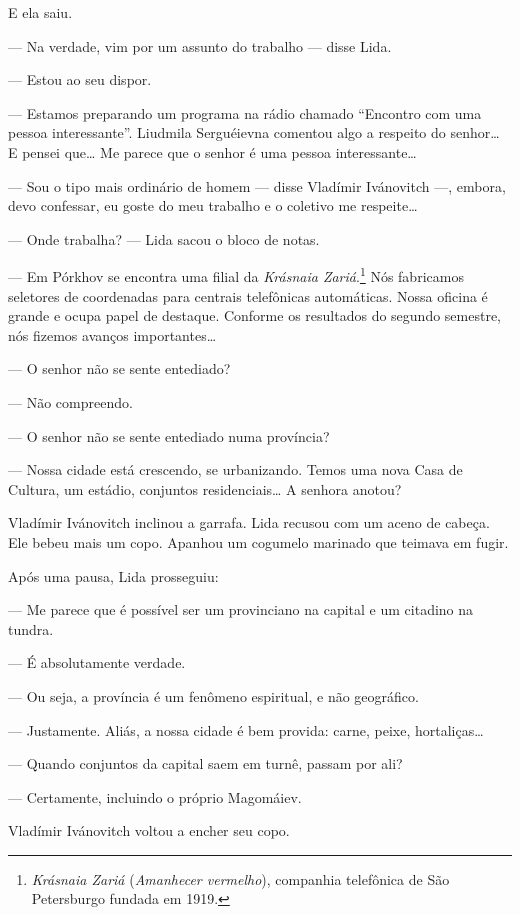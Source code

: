 E ela saiu.

--- Na verdade, vim por um assunto do trabalho --- disse Lida.

--- Estou ao seu dispor.

--- Estamos preparando um programa na rádio chamado ``Encontro com uma
pessoa interessante''. Liudmila Serguéievna comentou algo a respeito do
senhor\ldots{} E pensei que\ldots{} Me parece que o senhor é uma pessoa
interessante\ldots{}

--- Sou o tipo mais ordinário de homem --- disse Vladímir Ivánovitch
---, embora, devo confessar, eu goste do meu trabalho e o coletivo me
respeite\ldots{}

--- Onde trabalha? --- Lida sacou o bloco de notas.

--- Em Pórkhov se encontra uma filial da \emph{Krásnaia
Zariá}.\footnote{\emph{Krásnaia Zariá} (\emph{Amanhecer vermelho}),
  companhia telefônica de São Petersburgo fundada em 1919.} Nós
fabricamos seletores de coordenadas para centrais telefônicas
automáticas. Nossa oficina é grande e ocupa papel de destaque. Conforme
os resultados do segundo semestre, nós fizemos avanços importantes\ldots{}

--- O senhor não se sente entediado?

--- Não compreendo.

--- O senhor não se sente entediado numa província?

--- Nossa cidade está crescendo, se urbanizando. Temos uma nova Casa de
Cultura, um estádio, conjuntos residenciais\ldots{} A senhora anotou?

Vladímir Ivánovitch inclinou a garrafa. Lida recusou com um aceno de
cabeça. Ele bebeu mais um copo. Apanhou um cogumelo marinado
que teimava em fugir.

Após uma pausa, Lida prosseguiu:

--- Me parece que é possível ser um provinciano na capital e um citadino
na tundra.

--- É absolutamente verdade.

--- Ou seja, a província é um fenômeno espiritual, e não geográfico.

--- Justamente. Aliás, a nossa cidade é bem provida: carne, peixe,
hortaliças\ldots{}

--- Quando conjuntos da capital saem em turnê, passam por ali?

--- Certamente, incluindo o próprio Magomáiev.

Vladímir Ivánovitch voltou a encher seu copo.

